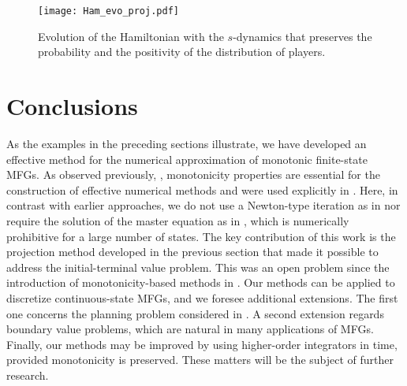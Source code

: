 \documentclass[12pt]{amsart}
\newcommand{\1}{{\chi}}
\theoremstyle{definition}
\begin{document}
        \begin{figure} 
                \centering
            \texttt{[image: Ham\_evo\_proj.pdf]}
            \caption{Evolution of the Hamiltonian with the $s$-dynamics that preserves the probability and the positivity of the distribution of players. 
                                        }
            \label{fig:cons_ham_pos}
        \end{figure}
\section{Conclusions} 
\label{sec:conclusions}
 
As the examples in the preceding sections illustrate, we have developed an effective method for the numerical approximation of monotonic finite-state MFGs.
As observed previously, \cite{MR2928376,achdou2013finite, DY, CDY}, monotonicity properties
are essential for the construction of effective numerical methods
and were used explicitly in \cite{AFG}. 
 Here, in contrast with earlier approaches, we
do not use a Newton-type iteration as in \cite{achdou2013finite, DY} nor require the solution of the master equation as in \cite{Gomes:2014kq}, which is numerically prohibitive for a large number of states. 
The key contribution of this work is the projection method developed in the previous section 
that made it possible to address the initial-terminal value problem. This was an open 
problem since the introduction of monotonicity-based methods in \cite{AFG}. 
 Our methods can be applied to discretize continuous-state MFGs, and we foresee additional extensions. The first one 
concerns the planning problem considered in \cite{CDY}. A second extension regards boundary 
value problems, which are natural in many applications of MFGs. Finally, our methods may be improved by using higher-order integrators in time, provided monotonicity is preserved. These matters will be
the subject of further research.  
\end{document}
